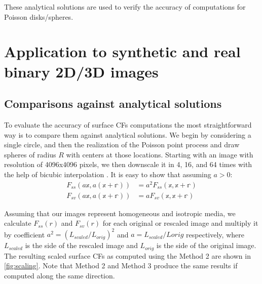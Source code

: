 \documentclass[reprint,amsmath,amssymb,aps,pre]{revtex4-1}
\begin{document}
These analytical solutions are used to verify the accuracy of computations for
Poisson disks/spheres.

\section{Application to synthetic and real binary 2D/3D images}
\label{sec:results}
\subsection{Comparisons against analytical solutions}
To evaluate the accuracy of surface CFs computations the most straightforward
way is to compare them against analytical solutions. We begin by considering a
single circle, and then the realization of the Poisson point process and draw
spheres of radius $R$ with centers at those locations. Starting with an image
with resolution of 4096x4096 pixels, we then downscale it in 4, 16, and 64 times
with the help of bicubic interpolation \cite{mexicans}. It is easy to show that
assuming $a > 0$:
\begin{align*}
  F_{ss}(a \mathbb{x}, a(\mathbb{x} + \mathbb{r})) &= a^2 F_{ss}(\mathbb{x},
  \mathbb{x} + \mathbb{r}) \\
  F_{sv}(a \mathbb{x}, a(\mathbb{x} + \mathbb{r})) &= a F_{sv}(\mathbb{x},
  \mathbb{x} + \mathbb{r})
\end{align*}

Assuming that our images represent homogeneous and isotropic media, we calculate
$F_{ss}(r)$ and $F_{sv}(r)$ for each original or rescaled image and multiply it
by coefficient $a^2 = (L_{scaled}/L_{orig})^2$ and $a = L_{scaled}/L{orig}$
respectively, where $L_{scaled}$ is the side of the rescaled image and
$L_{orig}$ is the side of the original image. The resulting scaled surface CFs
as computed using the Method 2 are shown in \cref{fig:scaling}. Note that
Method 2 and Method 3 produce the same results if computed along the same
direction.
\end{document}
